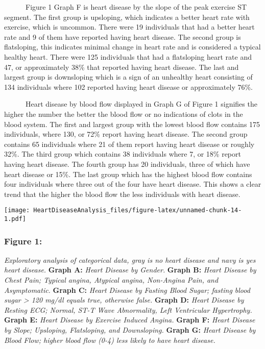 \documentclass[
]{article}
\begin{document}
~~~~~~Figure 1 Graph F is heart disease by the slope of the peak
exercise ST segment. The first group is upsloping, which indicates a
better heart rate with exercise, which is uncommon. There were 19
individuals that had a better heart rate and 9 of them have reported
having heart disease. The second group is flatsloping, this indicates
minimal change in heart rate and is considered a typical healthy heart.
There were 125 individuals that had a flatsloping heart rate and 47, or
approximately 38\% that reported having heart disease. The last and
largest group is downsloping which is a sign of an unhealthy heart
consisting of 134 individuals where 102 reported having heart disease or
approximately 76\%.

~~~~~~Heart disease by blood flow displayed in Graph G of Figure 1
signifies the higher the number the better the blood flow or no
indications of clots in the blood system. The first and largest group
with the lowest blood flow contains 175 individuals, where 130, or 72\%
report having heart disease. The second group contains 65 individuals
where 21 of them report having heart disease or roughly 32\%. The third
group which contains 38 individuals where 7, or 18\% report having heart
disease. The fourth group has 20 individuals, three of which have heart
disease or 15\%. The last group which has the highest blood flow
contains four individuals where three out of the four have heart
disease. This shows a clear trend that the higher the blood flow the
less individuals with heart disease.

\newpage

\texttt{[image: HeartDiseaseAnalysis\_files/figure-latex/unnamed-chunk-14-1.pdf]}

\hypertarget{figure-1}{%
\subsubsection{Figure 1:}\label{figure-1}}

\emph{Exploratory analysis of categorical data, gray is no heart disease
and navy is yes heart disease.} \textbf{Graph A:} \emph{Heart Disease by
Gender.} \textbf{Graph B:} \emph{Heart Disease by Chest Pain; Typical
angina, Atypical angina, Non-Angina Pain, and Asymptomatic.}
\textbf{Graph C:} \emph{Heart Disease by Fasting Blood Sugar; fasting
blood sugar \textgreater{} 120 mg/dl equals true, otherwise false.}
\textbf{Graph D:} \emph{Heart Disease by Resting ECG; Normal, ST-T Wave
Abnormality, Left Ventricular Hypertrophy.} \textbf{Graph E:}
\emph{Heart Disease by Exercise Induced Angina.} \textbf{Graph F:}
\emph{Heart Disease by Slope; Upsloping, Flatsloping, and Downsloping.}
\textbf{Graph G:} \emph{Heart Disease by Blood Flow; higher blood flow
(0-4) less likely to have heart disease.}
\end{document}
